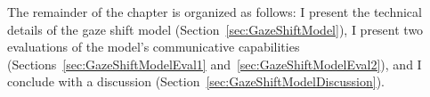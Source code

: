 The remainder of the chapter is organized as follows: I present the technical details of the gaze shift model (Section~\ref{sec:GazeShiftModel}), I present two evaluations of the model's communicative capabilities (Sections~\ref{sec:GazeShiftModelEval1} and~\ref{sec:GazeShiftModelEval2}), and I conclude with a discussion (Section~\ref{sec:GazeShiftModelDiscussion}).
